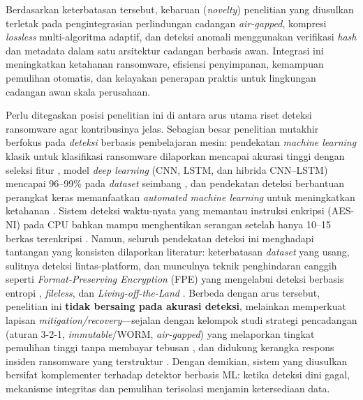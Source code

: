\documentclass{iaesarticle}
\begin{document}
Berdasarkan keterbatasan tersebut, kebaruan (\textit{novelty}) penelitian yang diusulkan terletak pada pengintegrasian perlindungan cadangan \textit{air-gapped}, kompresi \textit{lossless} multi-algoritma adaptif, dan deteksi anomali menggunakan verifikasi \textit{hash} dan metadata dalam satu arsitektur cadangan berbasis awan. Integrasi ini meningkatkan ketahanan ransomware, efisiensi penyimpanan, kemampuan pemulihan otomatis, dan kelayakan penerapan praktis untuk lingkungan cadangan awan skala perusahaan.

Perlu ditegaskan posisi penelitian ini di antara arus utama riset deteksi ransomware agar kontribusinya jelas. Sebagian besar penelitian mutakhir berfokus pada \textit{deteksi} berbasis pembelajaran mesin: pendekatan \textit{machine learning} klasik untuk klasifikasi ransomware dilaporkan mencapai akurasi tinggi dengan seleksi fitur \cite{31}, model \textit{deep learning} (CNN, LSTM, dan hibrida CNN--LSTM) mencapai 96--99\% pada \textit{dataset} seimbang \cite{30}, dan pendekatan deteksi berbantuan perangkat keras memanfaatkan \textit{automated machine learning} untuk meningkatkan ketahanan \cite{34}. Sistem deteksi waktu-nyata yang memantau instruksi enkripsi (AES-NI) pada CPU bahkan mampu menghentikan serangan setelah hanya 10--15 berkas terenkripsi \cite{32}. Namun, seluruh pendekatan deteksi ini menghadapi tantangan yang konsisten dilaporkan literatur: keterbatasan \textit{dataset} yang usang, sulitnya deteksi lintas-platform, dan munculnya teknik penghindaran canggih seperti \textit{Format-Preserving Encryption} (FPE) yang mengelabui deteksi berbasis entropi \cite{43}, \textit{fileless}, dan \textit{Living-off-the-Land} \cite{35}. Berbeda dengan arus tersebut, penelitian ini \textbf{tidak bersaing pada akurasi deteksi}, melainkan memperkuat lapisan \textit{mitigation/recovery}---sejalan dengan kelompok studi strategi pencadangan (aturan 3-2-1, \textit{immutable}/WORM, \textit{air-gapped}) yang melaporkan tingkat pemulihan tinggi tanpa membayar tebusan \cite{44}, dan didukung kerangka respons insiden ransomware yang terstruktur \cite{45}. Dengan demikian, sistem yang diusulkan bersifat komplementer terhadap detektor berbasis ML: ketika deteksi dini gagal, mekanisme integritas dan pemulihan terisolasi menjamin ketersediaan data.
\end{document}

